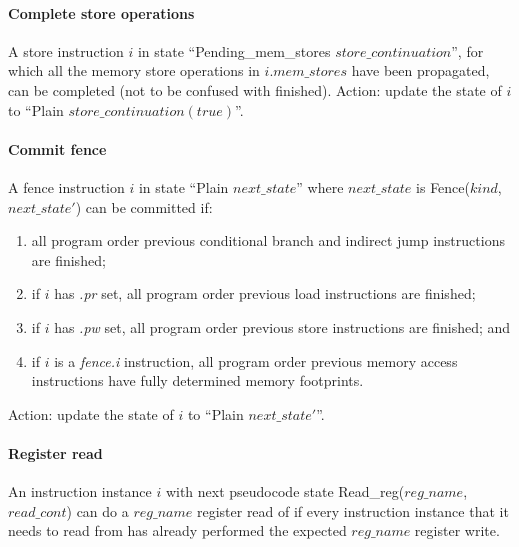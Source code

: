 \paragraph{Complete store operations}\label{omm:hart:complete_stores}
A store instruction $i$ in state ``{\sc Pending\_mem\_stores} $store\_continuation$'', for which all the memory store operations in $i.mem\_stores$ have been propagated, can be completed (not to be confused with finished).
Action: update the state of $i$ to ``{\sc Plain} $store\_continuation(true)$''.


\paragraph{Commit fence}\label{omm:hart:commit_barrier}
A fence instruction $i$ in state ``{\sc Plain} $next\_state$'' where $next\_state$ is {\sc Fence}($kind$, $next\_state'$) can be committed if:
\begin{enumerate}
\item all program order previous conditional branch and indirect jump instructions are finished;
\item if $i$ has {\em .pr} set, all program order previous load instructions are finished;
\item if $i$ has {\em .pw} set, all program order previous store instructions are finished; and
\item if $i$ is a {\em fence.i} instruction, all program order previous memory access instructions have fully determined memory footprints. 
\end{enumerate}
Action: update the state of $i$ to ``{\sc Plain} $next\_state'$''.


\paragraph{Register read}\label{omm:hart:reg_read}
An instruction instance $i$ with next pseudocode state {\sc Read\_reg}($reg\_name$, $read\_cont$) can do a $reg\_name$ register read of if every instruction instance that it needs to read from has already performed the expected $reg\_name$ register write.

